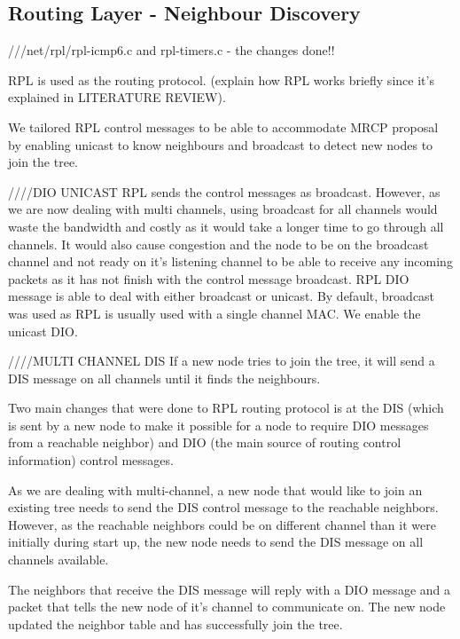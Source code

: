 


\subsection{Routing Layer - Neighbour Discovery}
///net/rpl/rpl-icmp6.c and rpl-timers.c - the changes done!!

RPL is used as the routing protocol. (explain how RPL works briefly since it's explained in LITERATURE REVIEW).

We tailored RPL control messages to be able to accommodate MRCP proposal by enabling unicast to know neighbours and broadcast to detect new nodes to join the tree.  

////DIO UNICAST
RPL sends the control messages as broadcast. However, as we are now dealing with multi channels, using broadcast for all channels would waste the bandwidth and costly as it would take a longer time to go through all channels. It would also cause congestion and the node to be on the broadcast channel and not ready on it's listening channel to be able to receive any incoming packets as it has not finish with the control message broadcast. RPL DIO message is able to deal with either broadcast or unicast. By default, broadcast was used as RPL is usually used with a single channel MAC. We enable the unicast DIO.

////MULTI CHANNEL DIS
If a new node tries to join the tree, it will send a DIS message on all channels until it finds the neighbours. 

Two main changes that were done to RPL routing protocol is at the DIS (which is sent by a new node to make it possible for a node to require DIO messages from a reachable neighbor) and DIO (the main source of routing control information) control messages.

As we are dealing with multi-channel, a new node that would like to join an existing tree needs to send the DIS control message to the reachable neighbors. However, as the reachable neighbors could be on different channel than it were initially during start up, the new node needs to send the DIS message on all channels available. 

The neighbors that receive the DIS message will reply with a DIO message and a packet that tells the new node of it's channel to communicate on. The new node updated the neighbor table and has successfully join the tree. 

